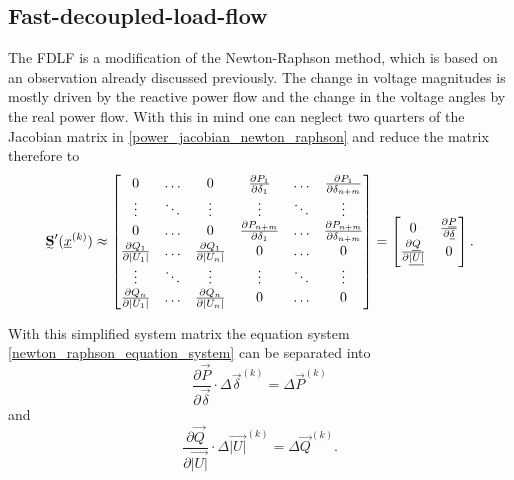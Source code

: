 \subsection{Fast-decoupled-load-flow}
\label{sec:fdlf}

The FDLF is a modification of the Newton-Raphson method, which is based on an observation already discussed previously. The change in voltage magnitudes is mostly driven by the reactive power flow and the change in the voltage angles by the real power flow. With this in mind one can neglect two quarters of the Jacobian matrix in \eqref{power_jacobian_newton_raphson} and reduce the matrix therefore to
\begin{equation}
	\mat S' (\vec x^{(k)}) \approx 
	\begin{bmatrix}
		0	& \hdots	& 0	& \frac{\partial P_1}{\partial \delta_1}	& \hdots	& \frac{\partial P_1}{\partial \delta_{n + m}} \\
		\vdots								& \ddots	& \vdots								& \vdots									& \ddots	& \vdots \\
		0	& \hdots	& 0	& \frac{\partial P_{n + m}}{\partial \delta_1}	& \hdots	& \frac{\partial P_{n + m}}{\partial \delta_{n + m}} \\
		\frac{\partial Q_1}{\partial |U_1|}	& \hdots	& \frac{\partial Q_1}{\partial |U_n|}	& 0	& \hdots	& 0 \\
		\vdots								& \ddots	& \vdots								& \vdots									& \ddots	& \vdots \\
		\frac{\partial Q_n}{\partial |U_1|}	& \hdots	& \frac{\partial Q_n}{\partial |U_n|}	& 0	& \hdots	& 0
	\end{bmatrix} =
	\begin{bmatrix}
		0								&	\frac{\partial \vec P}{\partial \vec \delta} \\
		\frac{\partial \vec Q}{\partial \vec{|U|}}	&	0
	\end{bmatrix}.
\end{equation}

With this simplified system matrix the equation system \eqref{newton_raphson_equation_system} can be separated into
\begin{equation}
	\frac{\partial \vec P}{\partial \vec \delta} \cdot \Delta \vec \delta^{(k)} = \Delta \vec P^{(k)}
\end{equation}
and
\begin{equation}
	\frac{\partial \vec Q}{\partial \vec{|U|}} \cdot \Delta \vec{|U|}^{(k)} = \Delta \vec Q^{(k)}.
\end{equation}

